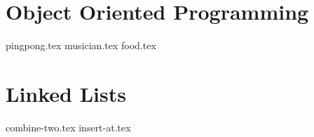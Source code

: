 \documentclass{exam}
\begin{document}
\section{Object Oriented Programming}
\begin{questions}
    {pingpong.tex} %
    {musician.tex}
    {food.tex}
\end{questions}

\section{Linked Lists}
\begin{questions}
    {combine-two.tex}
    {insert-at.tex}
\end{questions}
\end{document}
